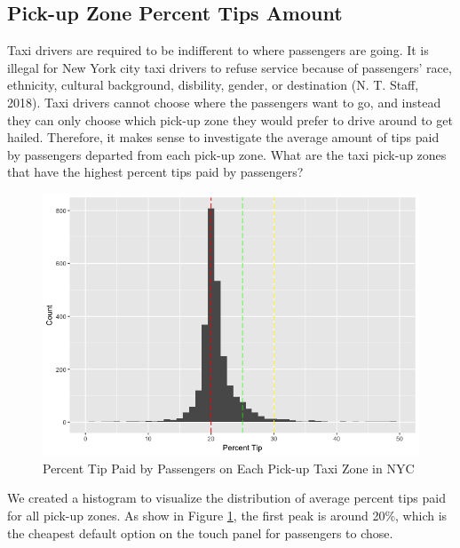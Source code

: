 \documentclass[12pt,twoside]{reedthesis}
\theoremstyle{definition}
\theoremstyle{definition}
\theoremstyle{definition}
\theoremstyle{remark}
\begin{document}
\subsection{Pick-up Zone Percent Tips
Amount}\label{pick-up-zone-percent-tips-amount}

Taxi drivers are required to be indifferent to where passengers are
going. It is illegal for New York city taxi drivers to refuse service
because of passengers' race, ethnicity, cultural background, disbility,
gender, or destination (N. T. Staff, 2018). Taxi drivers cannot choose
where the passengers want to go, and instead they can only choose which
pick-up zone they would prefer to drive around to get hailed. Therefore,
it makes sense to investigate the average amount of tips paid by
passengers departed from each pick-up zone. What are the taxi pick-up
zones that have the highest percent tips paid by passengers?
\begin{figure}

{\centering \includegraphics[width=5.96in]{figure/pickup_vis} 

}

\caption{Percent Tip Paid by Passengers on Each Pick-up Taxi Zone in NYC}\label{fig:pickup-vis}
\end{figure}
We created a histogram to visualize the distribution of average percent
tips paid for all pick-up zones. As show in Figure \ref{fig:pickup-vis},
the first peak is around 20\%, which is the cheapest default option on
the touch panel for passengers to chose.
\end{document}
